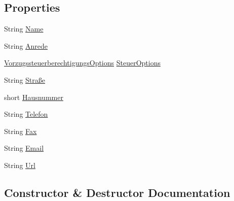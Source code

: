 \subsection*{Properties}
\begin{DoxyCompactItemize}
\item 
String \hyperlink{class_form_bot_1_1_form_options_a37d1dea3a3c8d04b0d3913047a9d6bbc}{Name}
\item 
String \hyperlink{class_form_bot_1_1_form_options_a611dbd4d2075578bab8f0ba2e67181ed}{Anrede}
\item 
\hyperlink{namespace_form_bot_aebf15a36725c2ee1db3018b157253939}{Vorzugssteuerberechtigungs\+Options} \hyperlink{class_form_bot_1_1_form_options_a999cc36d8ff6cdea8d1964da7ad96afa}{Steuer\+Options}
\item 
String \hyperlink{class_form_bot_1_1_form_options_ac6fffcaf3f8f97edfc02523a3fe525d8}{Straße}
\item 
short \hyperlink{class_form_bot_1_1_form_options_a83d2a2f98bfcf3c3d5353bb800bae81e}{Hausnummer}
\item 
String \hyperlink{class_form_bot_1_1_form_options_ae426c2c8e13bbe1df18c4daad292a109}{Telefon}
\item 
String \hyperlink{class_form_bot_1_1_form_options_ae171a8235b04ea316afe4804e17b105b}{Fax}
\item 
String \hyperlink{class_form_bot_1_1_form_options_a8a324a39051fa74d74e5890e7b89b929}{Email}
\item 
String \hyperlink{class_form_bot_1_1_form_options_ac498f1514f8b793b205232b637411c0a}{Url}
\end{DoxyCompactItemize}


\subsection{Constructor \& Destructor Documentation}
